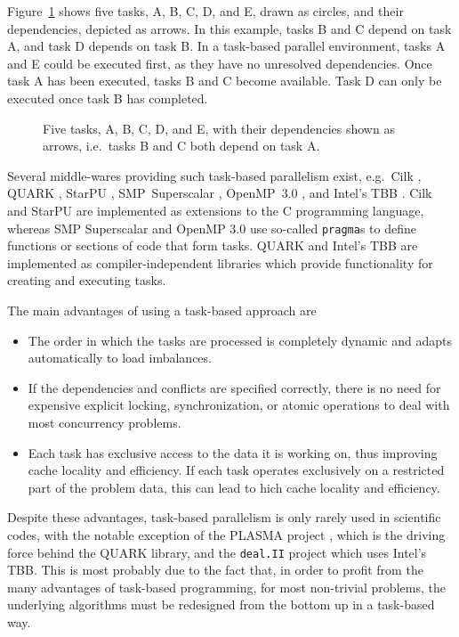 \documentclass[final]{siamltex}
\newcommand{\fig}[1]
    {Figure~\ref{fig:#1}}
\begin{document}
\fig{TasksExample} shows five tasks, A, B, C, D, and E, drawn
as circles, and their dependencies, depicted as arrows.
In this example, tasks B and C depend on task A, and task D
depends on task B.
In a task-based parallel environment, tasks A and E could
be executed first, as they have no unresolved dependencies.
Once task A has been executed, tasks B and C become available.
Task D can only be executed once task B has completed.

\begin{figure}
    \centerline{}
    
    \caption{Five tasks, A, B, C, D, and E, with their dependencies
        shown as arrows, i.e.~tasks B and C both depend on task A.}
    \label{fig:TasksExample}
\end{figure}

Several middle-wares providing such task-based
parallelism exist, e.g.~Cilk \cite{ref:Blumofe1995}, QUARK \cite{ref:QUARK},
StarPU \cite{ref:Augonnet2011}, SMP~Superscalar \cite{ref:SMPSuperscalar},
OpenMP~3.0 \cite{ref:Duran2009}, and Intel's TBB \cite{ref:Reinders2007}.
Cilk and StarPU are implemented as extensions to the C programming
language, whereas SMP Superscalar and OpenMP 3.0 use so-called {\tt pragma}s
to define functions or sections of code that form tasks.
QUARK and Intel's TBB are implemented as compiler-independent
libraries which provide functionality for creating and executing
tasks.

The main advantages of using a task-based approach are
%
\begin{itemize}
    \item The order in which the tasks are processed is completely
        dynamic and adapts automatically to load imbalances.
    \item If the dependencies and conflicts are specified correctly,
        there is no need for expensive explicit locking, synchronization,
        or atomic operations to deal with most concurrency problems.
    \item Each task has exclusive access to the data it is working on,
        thus improving cache locality and efficiency.
        If each task operates exclusively on a restricted part of the
        problem data, this can lead to hich cache locality and efficiency.
\end{itemize}
%
Despite these advantages, task-based parallelism is only rarely
used in scientific codes, with the notable exception of
the PLASMA project \cite{ref:Agullo2009}, which is the driving
force behind the QUARK library, and the {\tt deal.II} project
\cite{ref:Bangerth2007} which uses Intel's TBB.
This is most probably due to the fact that, in order to profit
from the many advantages of task-based programming,
for most non-trivial problems, the underlying algorithms must
be redesigned from the bottom up in a task-based way.
\end{document}
